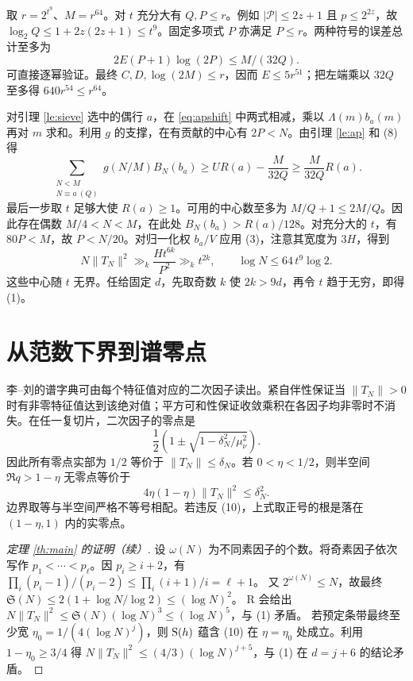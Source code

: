 \documentclass[UTF8,a4paper,11pt,fontset=windows]{ctexart}
\newcommand{\Sg}{\mathfrak S}
\newcommand{\Lam}{\Lambda}
\begin{document}
取 \(r=2^{t^9}\)、\(M=r^{64}\)。对 \(t\) 充分大有 \(Q,P\le r\)。例如 \(|\mathcal P|\le 2z+1\) 且 \(p\le 2^{2z}\)，故 \(\log_2 Q\le1+2z(2z+1)\le t^9\)。固定多项式 \(P\) 亦满足 \(P\le r\)。两种符号的误差总计至多为
\[
            2E(P+1)\log(2P)\le M/(32Q).                      \tag{8}
\]
可直接逐幂验证。最终 \(C,D,\log(2M)\le r\)，因而 \(E\le5r^{51}\)；把左端乘以 \(32Q\) 至多得 \(640r^{54}\le r^{64}\)。

对引理 \ref{le:sieve} 选中的偶行 \(a\)，在 \eqref{eq:apshift} 中两式相减，乘以 \(\Lam(m)b_a(m)\) 再对 \(m\) 求和。利用 \(g\) 的支撑，在有贡献的中心有 \(2P<N\)。由引理 \ref{le:ap} 和 (8) 得
\[
 \sum_{\substack{N<M\\N\equiv a\ (Q)}}g(N/M)B_N(b_a)
     \ge U R(a)-\frac{M}{32Q}
     \ge\frac{M}{32Q}R(a) .
\]
最后一步取 \(t\) 足够大使 \(R(a)\ge1\)。可用的中心数至多为 \(M/Q+1\le2M/Q\)。因此存在偶数 \(M/4<N<M\)，在此处
\(B_N(b_a)>R(a)/128\)。对充分大的 \(t\)，有 \(80P<M\)，故 \(P<N/20\)。对归一化权 \(b_a/V\) 应用 (3)，注意其宽度为 \(3H\)，得到
\[
               N\|T_N\|^2\gg_k \frac{H t^{6k}}{P^2}
                     \gg_k t^{2k},\qquad
               \log N\le 64\,t^9\log 2 .                       \tag{9}
\]
这些中心随 \(t\) 无界。任给固定 \(d\)，先取奇数 \(k\) 使 \(2k>9d\)，再令 \(t\) 趋于无穷，即得 (1)。

\section{从范数下界到谱零点}
李--刘的谱字典可由每个特征值对应的二次因子读出。紧自伴性保证当 \(\|T_N\|>0\) 时有非零特征值达到该绝对值；平方可和性保证收敛乘积在各因子均非零时不消失。在任一复切片，二次因子的零点是
\[
          \frac{1}{2}\left(1\pm\sqrt{1-\delta_N^2/\mu_\nu^2}\right).
\]
因此所有零点实部为 \(1/2\) 等价于 \(\|T_N\|\le\delta_N\)。若 \(0<\eta<1/2\)，则半空间 \(\Re q>1-\eta\) 无零点等价于
\[
                4\eta(1-\eta)\|T_N\|^2\le\delta_N^2 .          \tag{10}
\]
边界取等与半空间严格不等号相配。若违反 (10)，上式取正号的根是落在 \((1-\eta,1)\) 内的实零点。

\begin{proof}[定理 \ref{th:main} 的证明（续）]
设 \(\omega(N)\) 为不同素因子的个数。将奇素因子依次写作 \(p_1<\cdots<p_\ell\)。因 \(p_i\ge i+2\)，有
\(\prod_i(p_i-1)/(p_i-2)\le\prod_i(i+1)/i=\ell+1\)。
又 \(2^{\omega(N)}\le N\)，故最终
\(\Sg(N)\le 2(1+\log N/\log 2)\le(\log N)^2\)。
R 会给出 \(N\|T_N\|^2\le\Sg(N)(\log N)^3\le(\log N)^5\)，与 (1) 矛盾。
若预定条带最终至少宽 \(\eta_0=1/(4(\log N)^j)\)，则 \({\rm S}(h)\) 蕴含 (10) 在 \(\eta=\eta_0\) 处成立。利用 \(1-\eta_0\ge 3/4\) 得
\(N\|T_N\|^2\le (4/3)(\log N)^{j+5}\)，与 (1) 在 \(d=j+6\) 的结论矛盾。
\end{proof}
\end{document}

